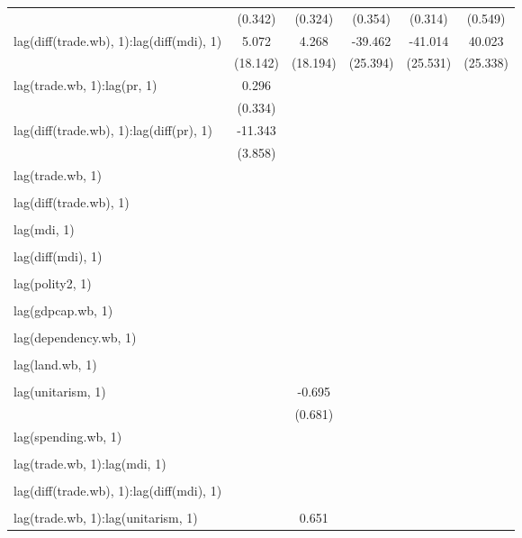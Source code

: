 \begin{tabular}{l*{5}{c}}
  		&(0.342) 		&(0.324) 		&(0.354) 		&(0.314) 		&(0.549) \\
lag(diff(trade.wb), 1):lag(diff(mdi), 1) 		&5.072 		&4.268 		&-39.462 		&-41.014 		&40.023 \\
  		&(18.142) 		&(18.194) 		&(25.394) 		&(25.531) 		&(25.338) \\
lag(trade.wb, 1):lag(pr, 1) 		&0.296 		& 		& 		& 		& \\
  		&(0.334) 		& 		& 		& 		& \\
lag(diff(trade.wb), 1):lag(diff(pr), 1) 		&-11.343\sym{***} 		& 		& 		& 		& \\
  		&(3.858) 		& 		& 		& 		& \\
lag(trade.wb, 1) 		& 		& 		& 		& 		& \\
  		& 		& 		& 		& 		& \\
lag(diff(trade.wb), 1) 		& 		& 		& 		& 		& \\
  		& 		& 		& 		& 		& \\
lag(mdi, 1) 		& 		& 		& 		& 		& \\
  		& 		& 		& 		& 		& \\
lag(diff(mdi), 1) 		& 		& 		& 		& 		& \\
  		& 		& 		& 		& 		& \\
lag(polity2, 1) 		& 		& 		& 		& 		& \\
  		& 		& 		& 		& 		& \\
lag(gdpcap.wb, 1) 		& 		& 		& 		& 		& \\
  		& 		& 		& 		& 		& \\
lag(dependency.wb, 1) 		& 		& 		& 		& 		& \\
  		& 		& 		& 		& 		& \\
lag(land.wb, 1) 		& 		& 		& 		& 		& \\
  		& 		& 		& 		& 		& \\
lag(unitarism, 1) 		& 		&-0.695 		& 		& 		& \\
  		& 		&(0.681) 		& 		& 		& \\
lag(spending.wb, 1) 		& 		& 		& 		& 		& \\
  		& 		& 		& 		& 		& \\
lag(trade.wb, 1):lag(mdi, 1) 		& 		& 		& 		& 		& \\
  		& 		& 		& 		& 		& \\
lag(diff(trade.wb), 1):lag(diff(mdi), 1) 		& 		& 		& 		& 		& \\
  		& 		& 		& 		& 		& \\
lag(trade.wb, 1):lag(unitarism, 1) 		& 		&0.651 		& 		& 		& \\

\end{tabular}
